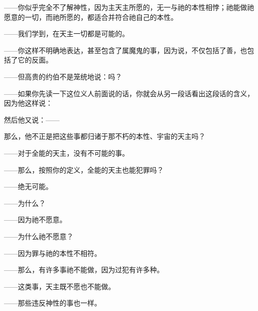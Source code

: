 ——你似乎完全不了解神性，因为主天主所愿的，无一与祂的本性相悖；祂能做祂愿意的一切，而祂所愿的，都适合并符合祂自己的本性。\par

——我们学到，在天主一切都是可能的。\par

——你这样不明确地表达，甚至包含了属魔鬼的事，因为说，不仅包括了善，也包括了它的反面。\par

——但高贵的约伯不是笼统地说：吗？\par

——如果你先读一下这位义人前面说的话，你就会从另一段话看出这段话的含义，因为他这样说：\par

然后他又说：——\par

那么，他不正是把这些事都归诸于那不朽的本性、宇宙的天主吗？\par

——对于全能的天主，没有不可能的事。\par

——那么，按照你的定义，全能的天主也能犯罪吗？\par

——绝无可能。\par

——为什么？\par

——因为祂不愿意。\par

——为什么祂不愿意？\par

——因为罪与祂的本性不相符。\par

——那么，有许多事祂不能做，因为过犯有许多种。\par

——这类事，天主既不愿也不能做。\par

——那些违反神性的事也一样。\par

